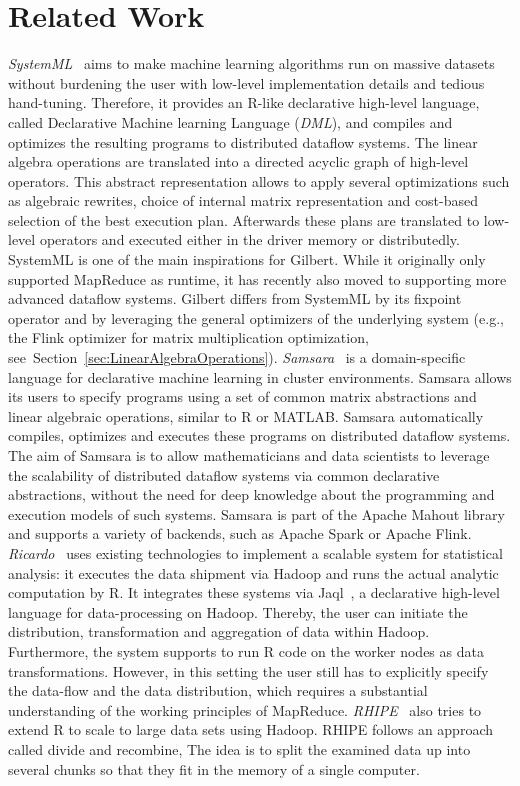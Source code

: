 \section{Related Work}
\label{sec:relatedWork}

{\em SystemML}~\cite{ghoting:2011a,Boehm2014,Boehm2014Hybrid,Schelter2015,Elgohary2016} aims to make machine learning algorithms run on massive datasets without burdening the user with low-level implementation details and tedious hand-tuning. Therefore, it provides an R-like declarative high-level language, called Declarative Machine learning Language (\emph{DML}), and compiles and optimizes the resulting programs to distributed dataflow systems.  The linear algebra operations are translated into a directed acyclic graph of high-level operators. This abstract representation allows to apply several optimizations such as algebraic rewrites, choice of internal matrix representation and cost-based selection of the best execution plan. Afterwards these plans are translated to low-level operators and executed either in the driver memory or distributedly. SystemML is one of the main inspirations for Gilbert. While it originally only supported MapReduce as runtime, it has recently also moved to supporting more advanced dataflow systems. Gilbert differs from SystemML by its fixpoint operator and by leveraging the general optimizers of the underlying system (e.g., the Flink optimizer for matrix multiplication optimization, see~Section~\ref{sec:LinearAlgebraOperations}). {\em Samsara}~\cite{Lyubimov2016, Schelter2016} is a domain-specific language for declarative machine learning in cluster environments. Samsara allows its users to specify programs using a set of common matrix abstractions and linear algebraic operations, similar to R or MATLAB. Samsara automatically compiles, optimizes and executes these programs on distributed dataflow systems. The aim of Samsara is to allow mathematicians and data scientists to leverage the scalability of distributed dataflow systems via common declarative abstractions, without the need for deep knowledge about the programming and execution models of such systems. Samsara is part of the Apache Mahout library~\cite{mahout:2011a} and supports a variety of backends, such as Apache Spark or Apache Flink. {\em Ricardo}~\cite{das:2010a} uses existing technologies to implement a scalable system for statistical analysis: it executes the data shipment via Hadoop and runs the actual analytic computation by R. It integrates these systems via Jaql~\cite{beyer:2011a}, a declarative high-level language for data-processing on Hadoop. Thereby, the user can initiate the distribution, transformation and aggregation of data within Hadoop. Furthermore, the system supports to run R code on the worker nodes as data transformations. However, in this setting the user still has to explicitly specify the data-flow and the data distribution, which requires a substantial understanding of the working principles of MapReduce. {\em RHIPE}~\cite{guha:s2012a} also tries to extend R to scale to large data sets using Hadoop. RHIPE follows an approach called divide and recombine, The idea is to split the examined data up into several chunks so that they fit in the memory of a single computer. 